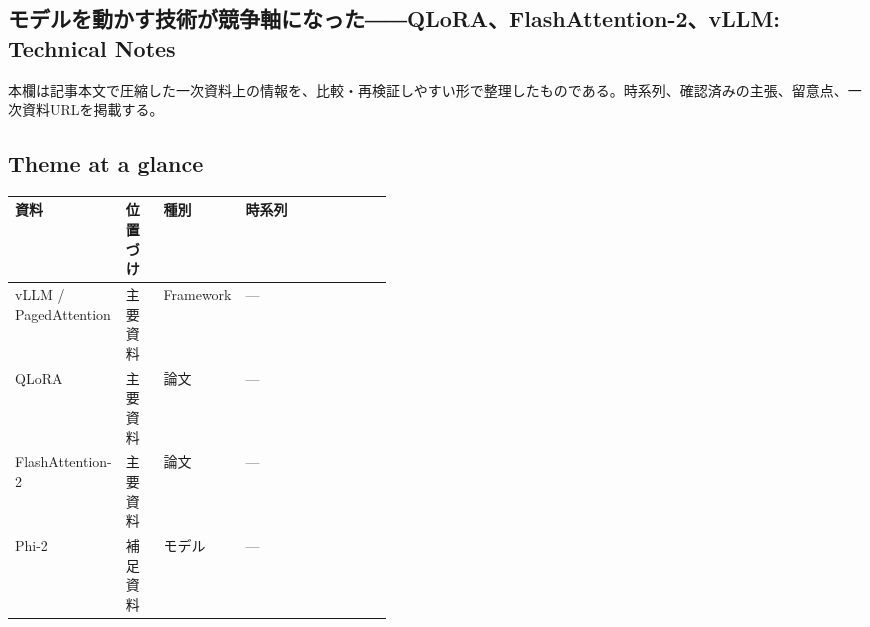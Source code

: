 \subsection*{モデルを動かす技術が競争軸になった――QLoRA、FlashAttention-2、vLLM: Technical Notes}
本欄は記事本文で圧縮した一次資料上の情報を、比較・再検証しやすい形で整理したものである。時系列、確認済みの主張、留意点、一次資料URLを掲載する。
\medskip
\subsection*{Theme at a glance}
\begin{center}
\footnotesize
\begin{tabularx}{\linewidth}{@{}p{0.20\linewidth}p{0.10\linewidth}p{0.14\linewidth}X@{}}
\toprule
資料 & 位置づけ & 種別 & 時系列 \\
\midrule
vLLM / PagedAttention & 主要資料 & Framework & — \\
QLoRA & 主要資料 & 論文 & — \\
FlashAttention-2 & 主要資料 & 論文 & — \\
Phi-2 & 補足資料 & モデル & — \\
\bottomrule
\end{tabularx}
\end{center}
\normalsize

